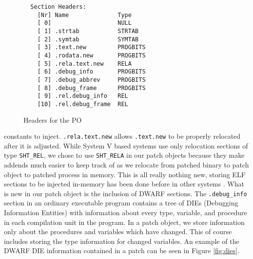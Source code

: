 \begin{figure}[ht]
\begin{center}
\begin{verbatim}
  Section Headers:
    [Nr] Name              Type          
    [ 0]                   NULL          
    [ 1] .strtab           STRTAB        
    [ 2] .symtab           SYMTAB        
    [ 3] .text.new         PROGBITS      
    [ 4] .rodata.new       PROGBITS      
    [ 5] .rela.text.new    RELA          
    [ 6] .debug_info       PROGBITS      
    [ 7] .debug_abbrev     PROGBITS      
    [ 8] .debug_frame      PROGBITS      
    [ 9] .rel.debug_info   REL           
    [10] .rel.debug_frame  REL           
\end{verbatim}
\end{center}
\caption{Headers for the PO}
\label{fig:elfheaders}
\end{figure}
constants to inject. \texttt{.rela.text.new} allows \texttt{.text.new}
to be properly relocated after it is adjusted. While System V based
systems use only relocation sections of type \texttt{SHT\_REL}, we
chose to use \texttt{SHT\_RELA} in our patch objects because they make
addends much easier to keep track of as we relocate from patched
binary to patch object to patched process in memory. This is all
really nothing new, storing ELF sections to be injected in-memory has
been done before in other systems \cite{eresi}. What is new in our patch object is
the inclusion of DWARF sections. The \texttt{.debug\_info} section in
an ordinary executable program contains a tree of DIEs (Debugging
Information Entities) with information about every type, variable, and
procedure in each compilation unit in the program. In a patch object,
we store information only about the procedures and variables which
have changed. This of course includes storing the type information for
changed variables. An example of the DWARF DIE information contained
in a patch can be seen in Figure \ref{fig:dies}.

